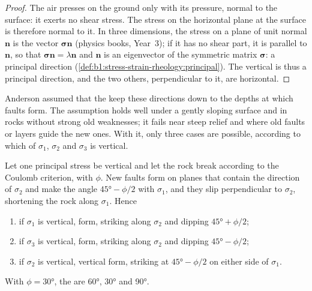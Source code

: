 \begin{proof}
The air presses on the ground only with its pressure, normal to the surface:
it exerts no shear stress. The stress on the horizontal plane at the surface
is therefore normal to it. In three dimensions, the stress on a plane of unit
normal $\mathbf n$ is the vector $\boldsymbol\sigma\mathbf n$ (physics books,
Year~3); if it has no shear part, it is parallel to $\mathbf n$, so that
$\boldsymbol\sigma\mathbf n = \lambda\mathbf n$ and $\mathbf n$ is an
eigenvector of the symmetric matrix $\boldsymbol\sigma$: a principal
direction (\cref{def:b1:stress-strain-rheology:principal}). The vertical is
thus a principal direction, and the two others, perpendicular to it, are
horizontal.
\end{proof}

Anderson assumed that the  keep these directions down to
the depths at which faults form. The assumption holds well under a gently
sloping surface and in rocks without strong old weaknesses; it fails near
steep relief and where old faults or layers guide the new ones. With it, only
three cases are possible, according to which of $\sigma_1$, $\sigma_2$ and
$\sigma_3$ is vertical.

\begin{theorem}\label{thm:b1:faults-folds-fabrics:anderson}
Let one principal stress be vertical and let the rock break according to the
Coulomb criterion, with  $\phi$. New faults form on
planes that contain the direction of $\sigma_2$ and make the angle
$\ang{45} - \phi/2$ with $\sigma_1$, and they slip perpendicular to $\sigma_2$,
shortening the rock along $\sigma_1$. Hence
\begin{enumerate}[label=(\alph*)]
  \item if $\sigma_1$ is vertical,  form, striking along
        $\sigma_2$ and dipping $\ang{45} + \phi/2$;
  \item if $\sigma_3$ is vertical,  form, striking along
        $\sigma_2$ and dipping $\ang{45} - \phi/2$;
  \item if $\sigma_2$ is vertical, vertical  form, striking
        at $\ang{45} - \phi/2$ on either side of $\sigma_1$.
\end{enumerate}
With $\phi = \ang{30}$, the  are \ang{60}, \ang{30} and \ang{90}.
\end{theorem}

